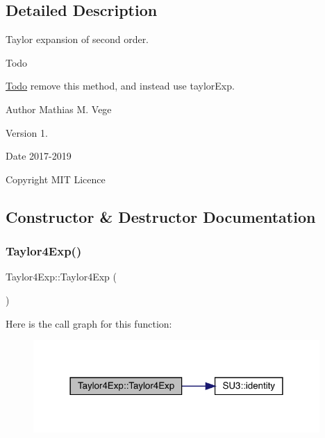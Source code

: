 \subsection{Detailed Description}
Taylor expansion of second order. 

\begin{DoxyRefDesc}{Todo}
\item[\mbox{\hyperlink{todo__todo000003}{Todo}}]remove this method, and instead use taylor\+Exp.\end{DoxyRefDesc}


\begin{DoxyAuthor}{Author}
Mathias M. Vege 
\end{DoxyAuthor}
\begin{DoxyVersion}{Version}
1. 
\end{DoxyVersion}
\begin{DoxyDate}{Date}
2017-\/2019 
\end{DoxyDate}
\begin{DoxyCopyright}{Copyright}
M\+IT Licence 
\end{DoxyCopyright}


\subsection{Constructor \& Destructor Documentation}
\mbox{\label{class_taylor4_exp_a0eac1c3288d296110c6a5e11acc0934d}} 
\subsubsection{\texorpdfstring{Taylor4Exp()}{Taylor4Exp()}}
{\footnotesize\ttfamily Taylor4\+Exp\+::\+Taylor4\+Exp (\begin{DoxyParamCaption}{ }\end{DoxyParamCaption})}

Here is the call graph for this function\+:\nopagebreak
\begin{figure}[H]
\begin{center}
\leavevmode
\includegraphics[width=309pt]{class_taylor4_exp_a0eac1c3288d296110c6a5e11acc0934d_cgraph}
\end{center}
\end{figure}


